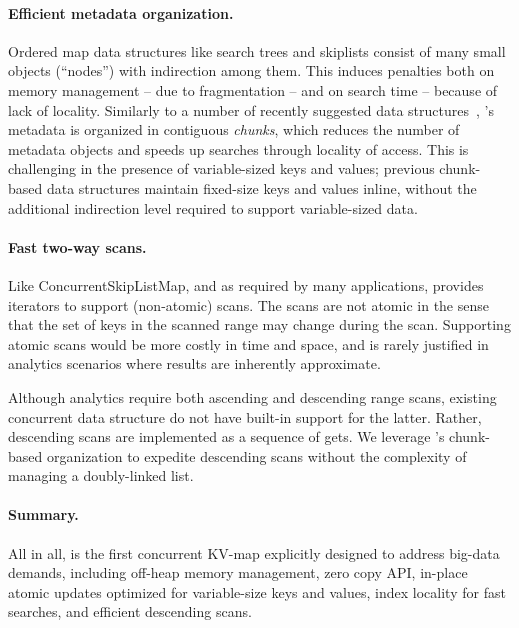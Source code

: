 \paragraph{Efficient metadata organization.}
Ordered map data structures like search trees and skiplists consist of many small objects (``nodes'') with indirection among them. 
This induces penalties both on memory management -- due to fragmentation -- and on search time -- because of lack of locality. 
Similarly to a number of recently suggested data structures~\cite{chunks,Braginsky-BTree,kiwi}, 
\oak's metadata is organized in contiguous \emph{chunks}, which reduces the number of metadata objects and speeds up searches through locality of access. 
This is challenging in the presence of variable-sized keys and values;  previous chunk-based data structures \cite{chunks,Braginsky-BTree,kiwi} 
maintain fixed-size keys and values inline, without the additional indirection level required to support variable-sized data.

\paragraph{Fast two-way scans.}
Like ConcurrentSkipListMap, and as required by many applications, \oak\/ provides iterators to support (non-atomic) scans. 
The scans are not atomic in the sense that the set of keys in the scanned range may change during the scan. 
Supporting atomic scans would be more costly in time and space,  %
and is rarely justified in analytics scenarios where results are inherently approximate.

Although analytics require both ascending and descending range scans, existing concurrent data structure 
do not have built-in support 
for the latter. Rather, descending scans are implemented as a sequence of gets.
We leverage \oak's chunk-based organization to expedite descending scans 
without the complexity of managing a doubly-linked list. 

\paragraph{Summary.} 
All in all, \oak\/ is the first concurrent KV-map explicitly designed to address big-data demands, including off-heap memory management,
zero copy API, in-place atomic updates optimized for variable-size keys and values, index locality for fast searches, and efficient descending scans.


